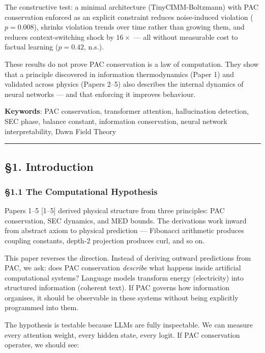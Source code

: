 \documentclass[
  11pt,
  a4paper]{article}
\begin{document}
The constructive test: a minimal architecture (TinyCIMM-Boltzmann) with
PAC conservation enforced as an explicit constraint reduces
noise-induced violation (\(p = 0.008\)), shrinks violation trends over
time rather than growing them, and reduces context-switching shock by
\(16\times\) --- all without measurable cost to factual learning
(\(p = 0.42\), n.s.).

These results do not prove PAC conservation is a law of computation.
They show that a principle discovered in information thermodynamics
(Paper 1) and validated across physics (Papers 2--5) also describes the
internal dynamics of neural networks --- and that enforcing it improves
behaviour.

\textbf{Keywords}: PAC conservation, transformer attention,
hallucination detection, SEC phase, balance constant, information
conservation, neural network interpretability, Dawn Field Theory

\begin{center}\rule{0.5\linewidth}{0.5pt}\end{center}

\subsection{§1. Introduction}\label{introduction}

\subsubsection{§1.1 The Computational
Hypothesis}\label{the-computational-hypothesis}

Papers 1--5 {[}1--5{]} derived physical structure from three principles:
PAC conservation, SEC dynamics, and MED bounds. The derivations work
inward from abstract axiom to physical prediction --- Fibonacci
arithmetic produces coupling constants, depth-2 projection produces
curl, and so on.

This paper reverses the direction. Instead of deriving outward
predictions from PAC, we ask: does PAC conservation \emph{describe} what
happens inside artificial computational systems? Language models
transform energy (electricity) into structured information (coherent
text). If PAC governs how information organises, it should be observable
in these systems without being explicitly programmed into them.

The hypothesis is testable because LLMs are fully inspectable. We can
measure every attention weight, every hidden state, every logit. If PAC
conservation operates, we should see:
\end{document}

